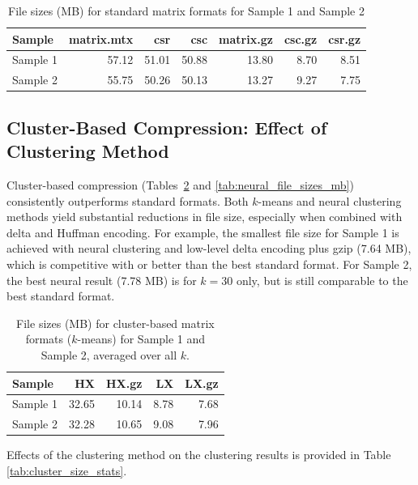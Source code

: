 \documentclass[unnumsec,webpdf,contemporary,large]{oup-authoring-template}
\begin{document}
\begin{table}[h!]
\centering
\caption{File sizes (MB) for standard matrix formats for Sample 1 and Sample 2}
\begin{tabular}{lrrrrrr}
\hline
Sample & matrix.mtx & csr & csc & matrix.gz & csc.gz & csr.gz \\
\hline
Sample 1 & 57.12 & 51.01 & 50.88 & 13.80 & 8.70 & 8.51 \\
Sample 2 & 55.75 & 50.26 & 50.13 & 13.27 & 9.27 & 7.75 \\
\hline
\end{tabular}
\label{tab:standard_file_sizes_mb}
\end{table}

\subsection{Cluster-Based Compression: Effect of Clustering Method}
Cluster-based compression (Tables~\ref{tab:kmeans_file_sizes_mb} and \ref{tab:neural_file_sizes_mb}) consistently outperforms standard formats. Both $k$-means and neural clustering methods yield substantial reductions in file size, especially when combined with delta and Huffman encoding. For example, the smallest file size for Sample 1 is achieved with neural clustering and low-level delta encoding plus gzip (7.64 MB), which is competitive with or better than the best standard format. For Sample 2, the best neural result (7.78 MB) is for $k=30$ only, but is still comparable to the best standard format.

\begin{table}[h!]
\centering
\caption{File sizes (MB) for cluster-based matrix formats ($k$-means) for Sample 1 and Sample 2, averaged over all $k$.}
\begin{tabular}{lrrrr}
\hline
Sample & HX & HX.gz & LX & LX.gz \\
\hline
Sample 1 & 32.65 & 10.14 & 8.78 & 7.68 \\
Sample 2 & 32.28 & 10.65 & 9.08 & 7.96 \\
\hline
\end{tabular}
\label{tab:kmeans_file_sizes_mb}
\end{table}

Effects of the clustering method on the clustering results is provided in Table \ref{tab:cluster_size_stats}.
\end{document}
